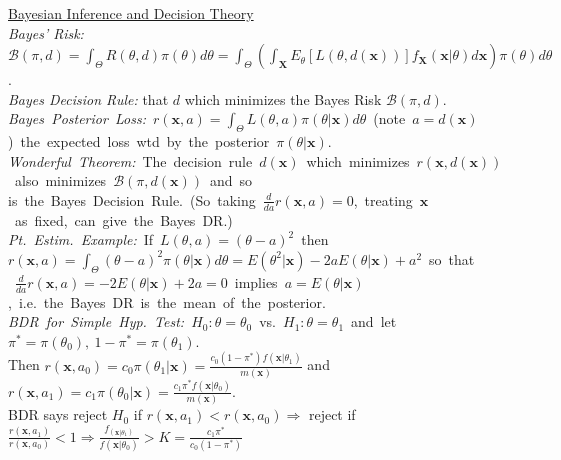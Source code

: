 \documentclass[11pt]{article}
\newcommand{\vecX}{\ensuremath{\mathbf{X}}}
\newcommand{\vecx}{\ensuremath{\mathbf{x}}}
\begin{document}
\indent\underline{Bayesian Inference and Decision Theory}\\
{\it Bayes' Risk:} $\mathcal{B}(\pi,d)=\int_\Theta R(\theta,d)\pi(\theta)d\theta =
\int_\Theta \left(\int_\vecX E_\theta[L(\theta,d(\vecx))] f_\vecX(\vecx|\theta) d\vecx\right)
\pi(\theta) d\theta$.\\ 
%
{\it Bayes Decision Rule:}  that $d$ which minimizes the Bayes Risk $\mathcal{B}(\pi,d)$.\\
%
\mbox{{\it Bayes Posterior Loss:} $r(\vecx,a)=\int_\Theta L(\theta,
a)\pi(\theta|\vecx)d\theta$ (note $a=d(\vecx)$) the expected loss wtd by the posterior
$\pi(\theta|\vecx)$.}\\
%
\mbox{{\it Wonderful Theorem:} The decision rule $d(\vecx)$ which minimizes $r(\vecx, d(\vecx))$
also minimizes $\mathcal{B}(\pi,d(\vecx))$ and so}\\
\hspace*{1.5em}\mbox{is the Bayes Decision Rule. (So taking
$\frac{d}{da} r(\vecx,a)=0$, treating $\vecx$ as fixed, can give the Bayes DR.)}\\
%
\mbox{{\it Pt.\ Estim.\ Example:} If $L(\theta,a) = (\theta - a)^2$ then $r(\vecx,a)=\int_\Theta
(\theta - a)^2
\pi(\theta|\vecx)d\theta = E(\theta^2|\vecx) -2aE(\theta|\vecx) + a^2$ so that}\\
\mbox{\hspace*{1.5em}  $\frac{d}{da} r(\vecx,a) = -2E(\theta|\vecx) +2a = 0$ implies
$a=E(\theta|\vecx)$, i.e.\ the Bayes DR is the mean of the posterior.}\\
%
\mbox{{\it BDR for Simple Hyp.\ Test:}  $H_0: \theta=\theta_0$ vs.
$H_1: \theta=\theta_1$ and let $\pi^*=\pi(\theta_0),\ 1-\pi^*=\pi(\theta_1)$.} \\
\hspace*{1.5em}  Then
$r(\vecx,a_0)=c_0\pi(\theta_1|\vecx)= \frac{c_0(1-\pi^*)f(\vecx|\theta_1)}{m(\vecx)}$ and
$r(\vecx,a_1)=c_1\pi(\theta_0|\vecx)= \frac{c_1\pi^*f(\vecx|\theta_0)}{m(\vecx)}$.\\
%
\hspace*{1.5em} BDR says reject $H_0$ if $r(\vecx,a_1)<r(\vecx,a_0)\Longrightarrow$ reject if
$\frac{r(\vecx,a_1)}{r(\vecx,a_0)}< 1 \Longrightarrow
\frac{f_(\vecx|\theta_1)}{f(\vecx|\theta_0)} > K = \frac{c_1\pi^*}{c_0(1-\pi^*)}$
\end{document}
